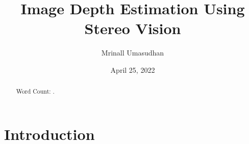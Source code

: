 \documentclass[11pt]{scrartcl}
\begin{document}
\title{Image Depth Estimation Using Stereo Vision}
\author{Mrinall Umasudhan}
\date{April 25, 2022}
\maketitle
{}

\begin{abstract}
  Word Count: .
\end{abstract}
\tableofcontents


\newpage

\section{Introduction}
\end{document}
